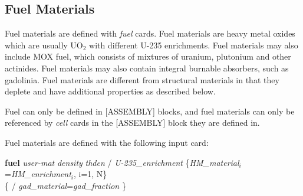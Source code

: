 \subsection{Fuel Materials}

Fuel materials are defined with {\it fuel} cards.
Fuel materials are heavy metal oxides which are usually UO$_2$ with different U-235 enrichments.
Fuel materials may also include MOX fuel, which consists of mixtures of uranium, plutonium and other actinides.
Fuel materials may also contain integral burnable absorbers, such as gadolinia.
Fuel materials are different from structural materials in that they deplete and have
additional properties as described below.

Fuel can only be defined in [ASSEMBLY] blocks, and fuel materials can only be referenced by {\it cell} cards
in the [ASSEMBLY] block they are defined in.

Fuel materials are defined with the following input card:

{\bf fuel} {\it user-mat} {\it density} {\it thden} / {\it U-235\_enrichment}
    \{{\it HM\_material$_i$}={\it HM\_enrichment$_i$}, i=1, N\}  \\
   \{ / {\it gad\_material}={\it gad\_fraction} \}

